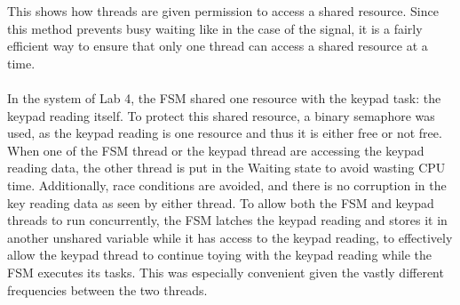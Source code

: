 \documentclass[12pt]{report}
\begin{document}
This shows how threads are given permission to access a shared resource. Since this method prevents
busy waiting like in the case of the signal, it is a fairly efficient way to ensure that only one
thread can access a shared resource at a time.\\\\
In the system of Lab 4, the FSM shared one resource with the keypad task: the keypad reading itself.
To protect this shared resource, a binary semaphore was used, as the keypad reading is one resource
and thus it is either free or not free. When one of the FSM thread or the keypad thread are
accessing the keypad reading data, the other thread is put in the Waiting state to avoid wasting CPU
time. Additionally, race conditions are avoided, and there is no corruption in the key reading data
as seen by either thread. To allow both the FSM and keypad threads to run concurrently, the FSM
latches the keypad reading and stores it in another unshared variable while it has access to the
keypad reading, to effectively allow the keypad thread to continue toying with the keypad reading
while the FSM executes its tasks. This was especially convenient given the vastly different
frequencies between the two threads.
\end{document}
